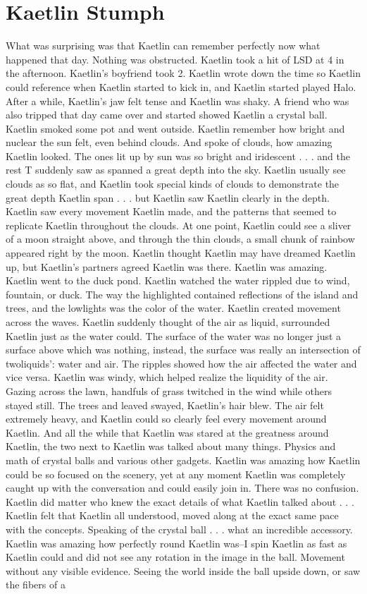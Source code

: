 \documentclass[12pt]{book}
\begin{document}
\chapter{Kaetlin Stumph}

What was surprising was that Kaetlin can remember perfectly now what happened that day. Nothing was obstructed. Kaetlin took a hit of LSD at 4 in the afternoon. Kaetlin's boyfriend took 2. Kaetlin wrote down the time so Kaetlin could reference when Kaetlin started to kick in, and Kaetlin started played Halo. After a while, Kaetlin's jaw felt tense and Kaetlin was shaky. A friend who was also tripped that day came over and started showed Kaetlin a crystal ball. Kaetlin smoked some pot and went outside. Kaetlin remember how bright and nuclear the sun felt, even behind clouds. And spoke of clouds, how amazing Kaetlin looked. The ones lit up by sun was so bright and iridescent . . .  and the rest T suddenly saw as spanned a great depth into the sky. Kaetlin usually see clouds as so flat, and Kaetlin took special kinds of clouds to demonstrate the great depth Kaetlin span . . .  but Kaetlin saw Kaetlin clearly in the depth. Kaetlin saw every movement Kaetlin made, and the patterns that seemed to replicate Kaetlin throughout the clouds. At one point, Kaetlin could see a sliver of a moon straight above, and through the thin clouds, a small chunk of rainbow appeared right by the moon. Kaetlin thought Kaetlin may have dreamed Kaetlin up, but Kaetlin's partners agreed Kaetlin was there. Kaetlin was amazing. Kaetlin went to the duck pond. Kaetlin watched the water rippled due to wind, fountain, or duck. The way the highlighted contained reflections of the island and trees, and the lowlights was the color of the water. Kaetlin created movement across the waves. Kaetlin suddenly thought of the air as liquid, surrounded Kaetlin just as the water could. The surface of the water was no longer just a surface above which was nothing, instead, the surface was really an intersection of twoliquids': water and air. The ripples showed how the air affected the water and vice versa. Kaetlin was windy, which helped realize the liquidity of the air. Gazing across the lawn, handfuls of grass twitched in the wind while others stayed still. The trees and leaved swayed, Kaetlin's hair blew. The air felt extremely heavy, and Kaetlin could so clearly feel every movement around Kaetlin. And all the while that Kaetlin was stared at the greatness around Kaetlin, the two next to Kaetlin was talked about many things. Physics and math of crystal balls and various other gadgets. Kaetlin was amazing how Kaetlin could be so focused on the scenery, yet at any moment Kaetlin was completely caught up with the conversation and could easily join in. There was no confusion. Kaetlin did matter who knew the exact details of what Kaetlin talked about . . .  Kaetlin felt that Kaetlin all understood, moved along at the exact same pace with the concepts. Speaking of the crystal ball . . .  what an incredible accessory. Kaetlin was amazing how perfectly round Kaetlin was--I spin Kaetlin as fast as Kaetlin could and did not see any rotation in the image in the ball. Movement without any visible evidence. Seeing the world inside the ball upside down, or saw the fibers of a 
\end{document}
